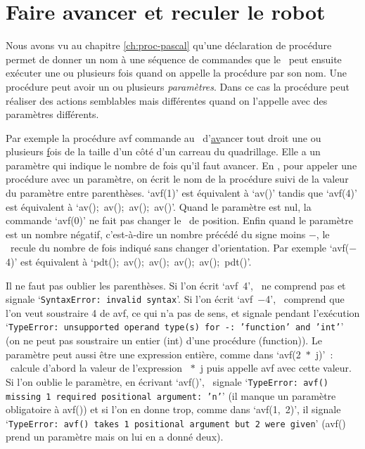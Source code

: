 \section{Faire avancer et reculer le robot}

Nous avons vu au chapitre \ref{ch:proc-pascal} qu'une déclaration de 
procédure permet de donner un nom à une séquence de commandes que le 
\robot\ peut ensuite exécuter une ou plusieurs fois quand on appelle la procédure par son  nom.
Une procédure peut avoir un ou plusieurs {\em paramètres}.  Dans ce cas la procédure
peut réaliser des actions semblables mais différentes quand on l'appelle avec des paramètres
différents.

Par exemple la procédure
 {\idt avf} commande au \robot\ d'\underline{av}ancer tout droit une
ou plusieurs \underline{f}ois de la taille d'un côté d'un carreau du quadrillage.
Elle a un paramètre qui indique le nombre de fois qu'il faut avancer.
En \python, pour appeler une procédure avec un paramètre, on écrit le nom de la procédure suivi
de la valeur du paramètre entre parenthèses.
`{\idt avf(1)}' est équivalent à `{\idt av()}' tandis que
`{\idt avf(4)}' est équivalent à `{\idt av();\ av();\ av();\ av()}'.
Quand le paramètre est nul, la commande `{\idt avf(0)}' ne fait pas changer le \robot\ de position.
Enfin quand le paramètre est un nombre négatif, c'est-à-dire un nombre précédé du
signe moins $-$, le \robot\ recule du nombre de fois indiqué sans changer d'orientation. Par exemple
`{\idt avf($-$4)}' est équivalent à `{\idt pdt();\ av();\ av();\ av();\ av();\ pdt()}'.

Il ne faut pas oublier les parenthèses. Si l'on écrit `{\idt avf\ 4}', \python\ ne comprend pas
et signale `{\tt SyntaxError: invalid syntax}'. Si l'on écrit `{\idt avf\ $-$4}', \python\
comprend que l'on veut soustraire 4 de {\idt avf}, ce qui n'a pas de sens, et 
signale pendant l'exécution
`{\tt TypeError: unsupported operand type(s) for -: 'function' and 'int'}'
(on ne peut pas soustraire un entier ({\idt int}) d'une procédure ({\idt function})).
Le paramètre peut aussi être une expression entière, comme
dans `{\idt avf(2\ $\ast$\ j)}'~: \python\ calcule d'abord la valeur de l'expression
{\idt 2\ $\ast$\ j} puis appelle {\idt avf} avec cette valeur.
Si l'on oublie le paramètre, en écrivant `{\idt avf()}', \python\ signale
`{\tt TypeError: avf() missing 1 required positional argument: 'n'}'
(il manque un paramètre obligatoire à {\idt avf()}) et si l'on en donne trop, comme dans
`{\idt avf(1,\ 2)}', il signale
`{\tt TypeError: avf() takes 1 positional argument but 2 were given}'
({\idt avf()} prend un paramètre mais on lui en a donné deux).


